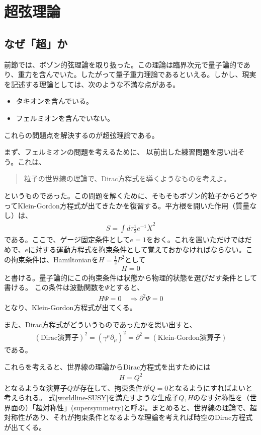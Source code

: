 \documentclass[report,paper=a4, fontsize=12pt, line_length=16cm, number_of_lines=33,dvipdfmx]{jlreq}
\numberwithin{equation}{chapter}
\numberwithin{equation}{section}
\newcommand{\del}{\partial}
\begin{document}
\chapter{超弦理論}

\section{なぜ「超」か}
前節では、ボゾン的弦理論を取り扱った。この理論は臨界次元で量子論的であり、重力を含んでいた。したがって量子重力理論であるといえる。しかし、現実を記述する理論としては、次のような不満な点がある。
\begin{itemize}
\item タキオンを含んでいる。
\item フェルミオンを含んでいない。
\end{itemize}
これらの問題点を解決するのが超弦理論である。

まず、フェルミオンの問題を考えるために、
以前出した練習問題を思い出そう。これは、
\begin{quotation}
粒子の世界線の理論で、Dirac方程式を導くようなものを考えよ。
\end{quotation}
というものであった。この問題を解くために、そもそもボゾン的粒子からどうやってKlein-Gordon方程式が出てきたかを復習する。平方根を開いた作用（質量なし）は、
\begin{align}
S=\int d\tau \frac12 e^{-1} \dot{X}^2
\end{align}
である。ここで、ゲージ固定条件として$e=1$をおく。これを置いただけではだめで、$e$に対する運動方程式を拘束条件として覚えておかなければならない。この拘束条件は、Hamiltonianを$H=\frac12 P^2$として
\begin{align}
H=0
\end{align}
と書ける。量子論的にこの拘束条件は状態から物理的状態を選びだす条件として書ける。
この条件は波動関数を$\Psi$とすると、
\begin{align}
H\Psi=0 \quad \Rightarrow \del^2 \Psi =0
\end{align}
となり、Klein-Gordon方程式が出てくる。

また、Dirac方程式がどういうものであったかを思い出すと、
\begin{align}
(\text{Dirac演算子})^2 =(\gamma^{\mu}\del_{\mu})^2
=\del^2 = (\text{Klein-Gordon演算子})
\end{align}
である。

これらを考えると、世界線の理論からDirac方程式を出すためには
\begin{align}
H=Q^2\label{worldline-SUSY}
\end{align}
となるような演算子$Q$が存在して、拘束条件が$Q=0$となるようにすればよいと考えられる。
式\eqref{worldline-SUSY}を満たすような生成子$Q,H$のなす対称性を（世界面の）「超対称性」(supersymmetry)と呼ぶ。まとめると、世界線の理論で、超対称性があり、それが拘束条件となるような理論を考えれば時空のDirac方程式が出てくる。
\end{document}

